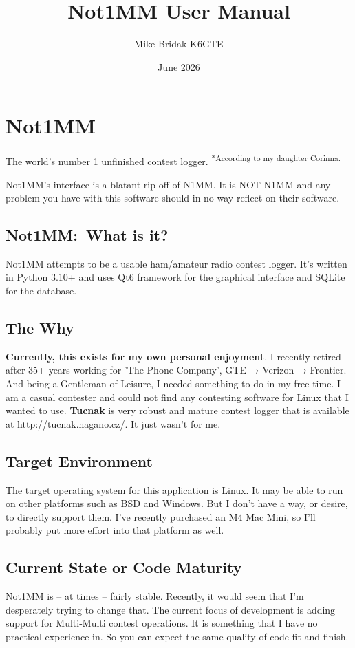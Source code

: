 \documentclass{article}
\title{Not1MM User Manual}
\author{Mike Bridak K6GTE}
\date{June 2026}
\begin{document}
\maketitle
\thispagestyle{empty}
\pagestyle{empty}
\newpage
\tableofcontents
\newpage
\pagestyle{plain}
\setcounter{page}{1}
\section{Not1MM}
The world's number 1 unfinished contest logger. \textsuperscript{*According to my daughter Corinna.}

\vspace{0.5cm}
Not1MM's interface is a blatant rip-off of N1MM. It is NOT N1MM and any problem you have with this software should in no way reflect on their software.
\subsection{Not1MM:~What is it?}
Not1MM attempts to be a usable ham/amateur radio contest logger. It's written in Python 3.10+ and uses Qt6 framework for the graphical interface and SQLite for the database.
\subsection{The Why}
\textbf{Currently, this exists for my own personal enjoyment}. I recently retired after 35+ years working for 'The Phone Company', GTE → Verizon → Frontier. And being a Gentleman of Leisure, I needed something to do in my free time. I am a casual contester and could not find any contesting software for Linux that I wanted to use. \textbf{Tucnak} is very robust and mature contest logger that is available at \url{http://tucnak.nagano.cz/}. It just wasn't for me.
\subsection{Target Environment}
The target operating system for this application is Linux. It may be able to run on other platforms such as BSD and Windows. But I don't have a way, or desire, to directly support them. I've recently purchased an M4 Mac Mini, so I'll probably put more effort into that platform as well.
\subsection{Current State or Code Maturity}
Not1MM is -- at times -- fairly stable. Recently, it would seem that I'm desperately trying to change that. The current focus of development is adding support for Multi-Multi contest operations. It is something that I have no practical experience in. So you can expect the same quality of code fit and finish.
\end{document}
